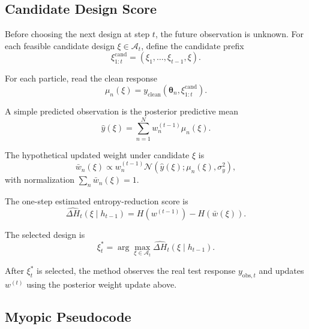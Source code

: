 \documentclass[11pt]{article}
\newcommand{\thetaVec}{\bm{\theta}}
\newcommand{\Normal}{\mathcal{N}}
\newcommand{\Aset}{\mathcal{A}}
\begin{document}
\subsection{Candidate Design Score}

Before choosing the next design at step $t$, the future observation is unknown. For each feasible candidate design $\xi\in\Aset_t$, define the candidate prefix
\begin{equation}
 \xi_{1:t}^{\mathrm{cand}}=(\xi_1,\ldots,\xi_{t-1},\xi).
\end{equation}

For each particle, read the clean response
\begin{equation}
 \mu_n(\xi)
 =
 y_{\mathrm{clean}}(\thetaVec_n,\xi_{1:t}^{\mathrm{cand}}).
\end{equation}

A simple predicted observation is the posterior predictive mean
\begin{equation}
 \hat y(\xi)
 =
 \sum_{n=1}^{N}w_n^{(t-1)}\mu_n(\xi).
\end{equation}

The hypothetical updated weight under candidate $\xi$ is
\begin{equation}
 \bar w_n(\xi)
 \propto
 w_n^{(t-1)}
 \Normal\!\left(
 \hat y(\xi);
 \mu_n(\xi),
 \sigma_y^2
 \right),
\end{equation}
with normalization $\sum_n \bar w_n(\xi)=1$.

The one-step estimated entropy-reduction score is
\begin{equation}
 \widehat{\Delta H}_t(\xi\mid h_{t-1})
 =
 H(w^{(t-1)})-H(\bar w(\xi)).
\end{equation}

The selected design is
\begin{equation}
 \xi_t^*
 =
 \arg\max_{\xi\in\Aset_t}
 \widehat{\Delta H}_t(\xi\mid h_{t-1}).
\end{equation}

After $\xi_t^*$ is selected, the method observes the real test response $y_{\mathrm{obs},t}$ and updates $w^{(t)}$ using the posterior weight update above.

\subsection{Myopic Pseudocode}
\end{document}
